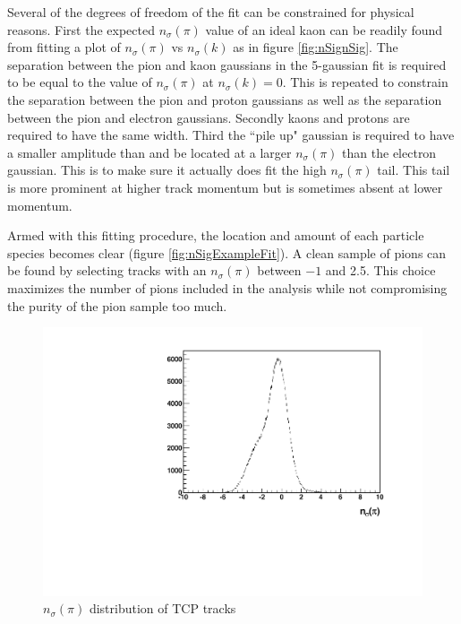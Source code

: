\documentclass[abstract = on,listof=totoc, bibliography=totoc]{scrreprt}
\begin{document}
Several of the degrees of freedom of the fit can be constrained for physical reasons. First the expected $n_\sigma(\pi)$ value of an ideal kaon can be readily found from fitting a plot of $n_\sigma(\pi)$ vs $n_\sigma(k)$ as in figure \ref{fig:nSignSig}. The separation between the pion and kaon gaussians in the 5-gaussian fit is required to be equal to the value of $n_\sigma(\pi)$ at $n_\sigma(k) = 0$. This is repeated to constrain the separation between the pion and proton gaussians as well as the separation between the pion and electron gaussians. Secondly kaons and protons are required to have the same width. Third the ``pile up" gaussian is required to have a smaller amplitude than and be located at a larger $n_\sigma(\pi)$ than the electron gaussian. This is to make sure it actually does fit the high $n_\sigma(\pi)$ tail. This tail is more prominent at higher track momentum but is sometimes absent at lower momentum.  

Armed with this fitting procedure, the location and amount of each particle species becomes clear (figure \ref{fig:nSigExampleFit}). A clean sample of pions can be found by selecting tracks with an $n_\sigma(\pi)$ between $-1$ and 2.5. This choice maximizes the number of pions included in the analysis while not compromising the purity of the pion sample too much.  


         
 \begin{figure}
\begin{center}
\includegraphics[width = .7\textwidth]{histogramExample.pdf}
\caption[$n_\sigma(\pi)$ distribution]{$n_\sigma(\pi)$ distribution of TCP tracks}
\label{fig:nSigExample}
\end{center}
\end{figure}
\end{document}
